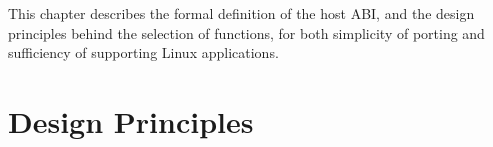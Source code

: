 




This chapter describes the formal definition of the host ABI, and 
the design principles behind the selection of functions, for both simplicity of porting and sufficiency of supporting Linux applications.






\section{Design Principles}


\begin{comment}
This chapter describes the formal definition of the host ABI, and discusses the rationale behind the definition, based on the design principles of \graphene{}.
The host ABI is a key component
to the \graphene{} design,
to simplify the OS development effort for achieving or restoring compatibility.
This chapter shows how to select the host ABI as a ``pinch point'' in a Linux-compatible OS, to virtualize OS components into the user space.
\end{comment}





